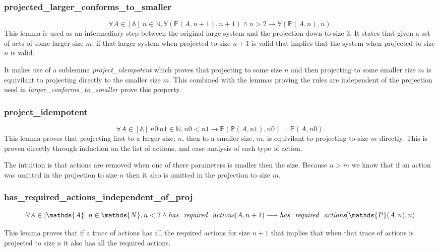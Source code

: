\documentclass[runningheads]{llncs}
\newcommand{\action}{\mathds{A}}
\newcommand{\listaction}{[\action]}
\newcommand{\actsvalid}[2]{\mathds{V}(#1, #2)}
\newcommand{\projectsize}[2]{\mathds{P}(#1, #2)}
\newcommand{\hra}[2]{\emph{has\_required\_actions}(#1, #2)}
\begin{document}
\subsubsection{projected\_larger\_conforms\_to\_smaller}
$$\forall A \in \listaction\ n \in \mathds{N}, \actsvalid{\projectsize{A}{n+1}}{n+1} \wedge n > 2 \longrightarrow \actsvalid{\projectsize{A}{n}}{n}.$$
This lemma is used as an intermediary step between the original large system and the projection down to size 3. It states that given a set of acts of some larger size $m$, if that larger system when projected to size $n+1$ is valid that implies that the system when projected to size $n$ is valid.

It makes use of a sublemma \emph{project\_idempotent} which proves that projecting to some size $n$ and then projecting to some smaller size $m$ is equivilant to projecting directly to the smaller size $m$. This combined with the lemmas proving the rules are independent of the projection used in \emph{larger\_conforms\_to\_smaller} prove this property.

\subsubsection{project\_idempotent}
$$\forall A \in \listaction\ n0\ n1 \in \mathds{N}, n0 < n1 \longrightarrow \projectsize{\projectsize{A}{n1}}{n0} = \projectsize{A}{n0}.$$
This lemma proves that projecting first to a larger size, $n$, then to a smaller size, $m$, is equivilant to projecting to size $m$ directly. This is proven directly through induction on the list of actions, and case analysis of each type of action. 

The intuition is that actions are removed when one of there parameters is smaller then the size. Because $n>m$ we know that if an action was omitted in the projection to size $n$ then it also is omitted in the projection to size $m$.  

\subsubsection{has\_required\_actions\_independent\_of\_proj}
$$ \forall A \in \listaction\ n \in \mathds{N}, n < 2 \wedge \hra{A}{n+1} \longrightarrow \hra{\projectsize{A}{n}}{n} $$


This lemma proves that if a trace of actions has all the required actions for size $n+1$ that implies that when that trace of actions is projected to size $n$ it also has all the required actions. 
\end{document}
